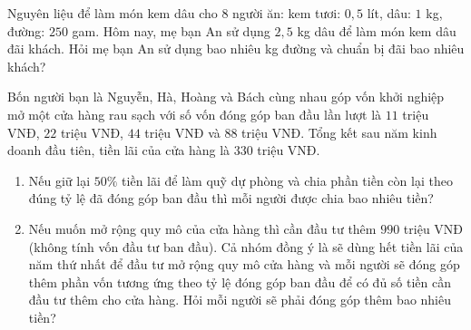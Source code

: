 \begin{bt}%
Nguyên liệu để làm món kem dâu cho $8$ người ăn: kem tươi: $0{,}5$ lít, dâu: $1$ kg, đường: $250$ gam. Hôm nay, mẹ bạn An sử dụng $2{,}5$ kg dâu để làm món kem dâu đãi khách. Hỏi mẹ bạn An sử dụng bao nhiêu kg đường và chuẩn bị đãi bao nhiêu khách? 
\end{bt}

\begin{bt}%
Bốn người bạn là Nguyễn, Hà, Hoàng và Bách cùng nhau góp vốn khởi nghiệp mở một cửa hàng rau sạch với số vốn đóng góp ban đầu lần lượt là $11$ triệu VNĐ, $22$ triệu VNĐ, $44$ triệu VNĐ và $88$ triệu VNĐ. Tổng kết sau năm kinh doanh đầu tiên, tiền lãi của cửa hàng là $330$ triệu VNĐ.
\begin{enumerate}
	\item Nếu giữ lại $50\%$ tiền lãi để làm quỹ dự phòng và chia phần tiền còn lại theo đúng tỷ lệ đã đóng góp ban đầu thì mỗi người được chia bao nhiêu tiền?
	\item Nếu muốn mở rộng quy mô của cửa hàng thì cần đầu tư thêm $990$ triệu VNĐ (không tính vốn đầu tư ban đầu). Cả nhóm đồng ý là sẽ dùng hết tiền lãi của năm thứ nhất để đầu tư mở rộng quy mô cửa hàng và mỗi người sẽ đóng góp thêm phần vốn tương ứng theo tỷ lệ đóng góp ban đầu để có đủ số tiền cần đầu tư thêm cho cửa hàng. Hỏi mỗi người sẽ phải đóng góp thêm bao nhiêu tiền? 
\end{enumerate}
\end{bt}
